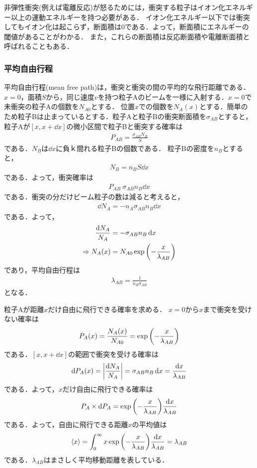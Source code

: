 \documentclass{report}
\begin{document}
非弾性衝突(例えば電離反応)が怒るためには，衝突する粒子はイオン化エネルギー以上の運動エネルギーを持つ必要がある．
イオン化エネルギー以下では衝突してもイオン化は起こらず，断面積は0である．よって，断面積にエネルギーの閾値があることがわかる．
また，これらの断面積は反応断面積や電離断面積と呼ばれることもある．

\subsubsection{平均自由行程}
平均自由行程(mean free path)は，衝突と衝突の間の平均的な飛行距離である．
$x=0$，面積$S$から，同じ速度$v$を持つ粒子Aのビームを一様に入射する．$x=0$で未衝突の粒子Aの個数を$N_{A0}$とする．
位置$x$での個数を$N_A(x)$とする．簡単のため粒子Bは止まっているとする．粒子Aと粒子Bの衝突断面積を$\sigma_{AB}$とすると，
粒子Aが$[x,x+\dd{x}]$の微小区間で粒子Bと衝突する確率は
\begin{align}
  P_{AB} = \frac{\sigma_{AB}N_B}{S}
\end{align}
である．$N_B$は$\dd{x}$に負ｋ間れる粒子Bの個数である．
粒子Bの密度を$n_B$とすると，
\begin{align}
  N_B = n_B S \dd{x}
\end{align}
である．よって，衝突確率は
\begin{align}
  P_{AB} ~ \sigma_{AB} n_B \dd{x}
\end{align}
である．衝突の分だけビーム粒子の数は減ると考えると，
\begin{align}
  \dd{N_A} = -n_A \sigma_{AB} n_B \dd{x}
\end{align}
である．よって，
\begin{align}
  \frac{\dd{N_A}}{N_{A}} &= - \sigma_{AB} n_B \dd{x}\\
  \Rightarrow N_A(x) &= N_{A0} \exp\qty(-\frac{x}{\lambda_{AB}})
\end{align}
であり，平均自由行程は
\begin{align}
  \lambda_{AB} = \frac{1}{n_B \sigma_{AB}}
\end{align}
となる．

粒子Aが距離$x$だけ自由に飛行できる確率を求める．
$x=0$から$x$まで衝突を受けない確率は
\begin{align}
  P_A(x) = \frac{N_A(x)}{N_{A0}} = \exp\qty(-\frac{x}{\lambda_{AB}})
\end{align}
である．$[x,x+\dd{x}]$の範囲で衝突を受ける確率は
\begin{align}
  \dd{P_A(x)} = \abs{\frac{\dd{N_A}}{N_A}} = \sigma_{AB} n_B \dd{x} = \frac{\dd{x}}{\lambda_{AB}}
\end{align}
である．よって，$x$だけ自由に飛行できる確率は
\begin{align}
  P_A\times\dd{P_A} = \exp\qty(-\frac{x}{\lambda_{AB}})\frac{\dd{x}}{\lambda_{AB}}
\end{align}
である．よって，自由に飛行できる距離$x$の平均値は
\begin{align}
  \ev{x} = \int_0^{\infty} x\exp\qty(-\frac{x}{\lambda_{AB}})\frac{\dd{x}}{\lambda_{AB}} = \lambda_{AB}
\end{align}
である．$\lambda_{AB}$はまさしく平均移動距離を表している．
\end{document}
